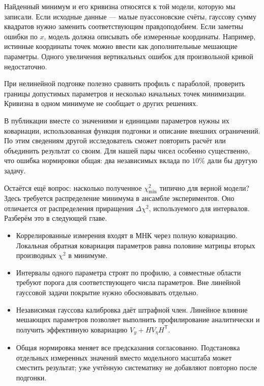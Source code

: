 \documentclass[
  russian,
  11pt,
  a4paper,
  open=any]{scrbook}
\providecommand{\tightlist}{%
  \setlength{\itemsep}{0pt}\setlength{\parskip}{0pt}}
\begin{document}
Найденный минимум и его кривизна относятся к той модели, которую мы
записали. Если исходные данные --- малые пуассоновские счёты, гауссову
сумму квадратов нужно заменить соответствующим правдоподобием. Если
заметны ошибки по \(x\), модель должна описывать обе измеренные
координаты. Например, истинные координаты точек можно ввести как
дополнительные мешающие параметры. Одного увеличения вертикальных ошибок
для произвольной кривой недостаточно.

При нелинейной подгонке полезно сравнить профиль с параболой, проверить
границы допустимых параметров и несколько начальных точек минимизации.
Кривизна в одном минимуме не сообщает о других решениях.

В публикации вместе со значениями и единицами параметров нужны их
ковариации, использованная функция подгонки и описание внешних
ограничений. По этим сведениям другой исследователь сможет повторить
расчёт или объединить результат со своим. Для нашей пары чисел особенно
существенно, что ошибка нормировки общая: два независимых вклада по
\(10\%\) дали бы другую задачу.

Остаётся ещё вопрос: насколько полученное \(\chi^2_{\min}\) типично для
верной модели? Здесь требуется распределение минимума в ансамбле
экспериментов. Оно отличается от распределения приращения
\(\Delta\chi^2\), используемого для интервалов. Разберём это в следующей
главе.

\begin{bookchaptersummary}

\begin{itemize}
\tightlist
\item
  Коррелированные измерения входят в МНК через полную ковариацию.
  Локальная обратная ковариация параметров равна половине матрицы вторых
  производных \(\chi^2\) в минимуме.
\item
  Интервалы одного параметра строят по профилю, а совместные области
  требуют порога для соответствующего числа параметров. Вне линейной
  гауссовой задачи покрытие нужно обосновывать отдельно.
\item
  Независимая гауссова калибровка даёт штрафной член. Линейное влияние
  мешающих параметров позволяет выполнить профилирование аналитически и
  получить эффективную ковариацию \(V_y+HV_\eta H^{\mathsf T}\).
\item
  Общая нормировка меняет все предсказания согласованно. Подстановка
  отдельных измеренных значений вместо модельного масштаба может
  сместить результат; уже учтённую систематику не добавляют повторно
  после подгонки.
\end{itemize}

\end{bookchaptersummary}
\end{document}
